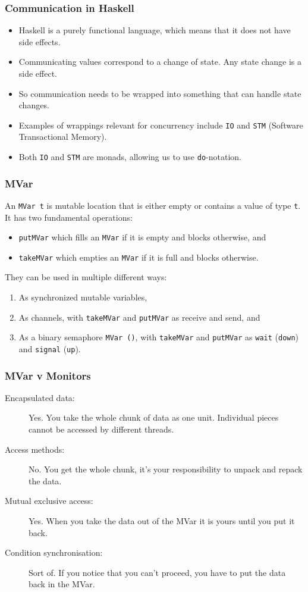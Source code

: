 \documentclass[notheorems]{beamer}%
\theoremstyle{definition}
\begin{document}
\begin{frame}[fragile]
  \frametitle{Communication in Haskell}
  \begin{itemize}
  \item Haskell is a purely functional language, which means that it does not
    have \alert{side effects}.
  \item Communicating values correspond to a change of state. Any state change
    is a side effect.
  \item So communication needs to be wrapped into something that can handle
    state changes.
  \item Examples of wrappings relevant for concurrency include \verb-IO- and
    \verb-STM- (Software Transactional Memory).
  \item Both \verb-IO- and \verb-STM- are monads, allowing us to use
    \verb-do--notation.
  \end{itemize}
\end{frame}

\begin{frame}[fragile]
  \frametitle{MVar}
  An \verb-MVar t- is mutable location that is either empty or contains a
  value of type \verb-t-. It has two fundamental operations:
  \begin{itemize}
  \item \verb-putMVar- which fills an \verb-MVar- if it is empty and
    blocks otherwise, and
  \item \verb-takeMVar- which empties an \verb-MVar- if it is full and
    blocks otherwise.
  \end{itemize}

  They can be used in multiple different ways:
  \begin{enumerate}
  \item As synchronized \alert{mutable variables},
  \item As \alert{channels}, with \verb-takeMVar- and \verb-putMVar- as
    receive and send, and
  \item As a \alert{binary semaphore} \verb-MVar ()-, with \verb-takeMVar- and
    \verb-putMVar- as \verb-wait- (\verb-down-) and \verb-signal- (\verb-up-).
  \end{enumerate}
\end{frame}

\begin{frame}
  \frametitle{MVar v Monitors}
  \begin{description}
  \item[Encapsulated data:] Yes. You take the whole chunk of data as one
    unit. Individual pieces cannot be accessed by different threads.
  \item[Access methods:] No. You get the whole chunk, it's your responsibility
    to unpack and repack the data.
  \item[Mutual exclusive access:] Yes. When you take the data out of the MVar
    it is yours until you put it back.
  \item[Condition synchronisation:] Sort of. If you notice that you can't
    proceed, you have to put the data back in the MVar.
  \end{description}
\end{frame}
\end{document}
